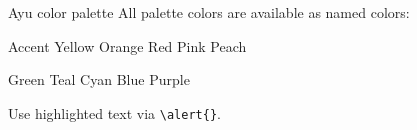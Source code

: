 \documentclass[aspectratio=169, 12pt]{beamer}
\begin{document}
\begin{frame}{Ayu color palette}
	All palette colors are available as named colors:

	\medskip
	\textcolor{ayuAccent}{Accent} \quad
	\textcolor{ayuYellow}{Yellow} \quad
	\textcolor{ayuOrange}{Orange} \quad
	\textcolor{ayuRed}{Red} \quad
	\textcolor{ayuPink}{Pink} \quad
	\textcolor{ayuPeach}{Peach}

	\smallskip
	\textcolor{ayuGreen}{Green} \quad
	\textcolor{ayuTeal}{Teal} \quad
	\textcolor{ayuCyan}{Cyan} \quad
	\textcolor{ayuBlue}{Blue} \quad
	\textcolor{ayuPurple}{Purple}

	\medskip
	Use \alert{highlighted text} via \texttt{\textbackslash alert\{\}}.
\end{frame}
\end{document}
